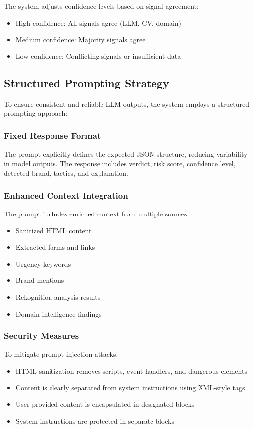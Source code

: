 \documentclass[conference]{IEEEtran}
\begin{document}
The system adjusts confidence levels based on signal agreement:
\begin{itemize}
\item High confidence: All signals agree (LLM, CV, domain)
\item Medium confidence: Majority signals agree
\item Low confidence: Conflicting signals or insufficient data
\end{itemize}


\subsection{Structured Prompting Strategy}

To ensure consistent and reliable LLM outputs, the system employs a structured prompting approach:

\subsubsection{Fixed Response Format}

The prompt explicitly defines the expected JSON structure, reducing variability in model outputs. The response includes verdict, risk score, confidence level, detected brand, tactics, and explanation.

\subsubsection{Enhanced Context Integration}

The prompt includes enriched context from multiple sources:
\begin{itemize}
\item Sanitized HTML content
\item Extracted forms and links
\item Urgency keywords
\item Brand mentions
\item Rekognition analysis results
\item Domain intelligence findings
\end{itemize}

\subsubsection{Security Measures}

To mitigate prompt injection attacks:
\begin{itemize}
\item HTML sanitization removes scripts, event handlers, and dangerous elements
\item Content is clearly separated from system instructions using XML-style tags
\item User-provided content is encapsulated in designated blocks
\item System instructions are protected in separate blocks
\end{itemize}
\end{document}
